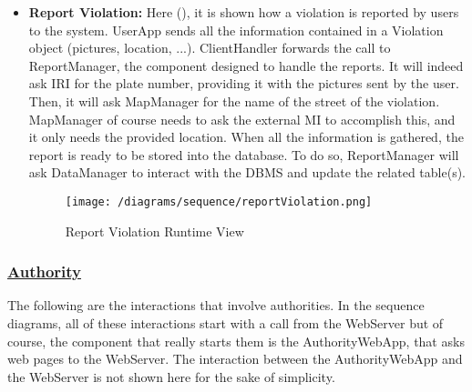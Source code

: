 \begin{itemize}
				\FloatBarrier
				\newpage
			
				\item \textbf{Report Violation:} Here (), it is shown how a violation is reported by users to the system. UserApp sends all the information contained in a Violation object (pictures, location, ...). ClientHandler forwards the call to ReportManager, the component designed to handle the reports. It will indeed ask IRI for the plate number, providing it with the pictures sent by the user. Then, it will ask MapManager for the name of the street of the violation. MapManager of course needs to ask the external MI to accomplish this, and it only needs the provided location. When all the information is gathered, the report is ready to be stored into the database. To do so, ReportManager will ask DataManager to interact with the DBMS and update the related table(s).
				
				\begin{figure}[h!]
					\centering
					\texttt{[image: /diagrams/sequence/reportViolation.png]}
					\caption{\label{fig:reportViolationRuntime} Report Violation Runtime View}
				\end{figure}
			\end{itemize}
		
		\subsubsection[Authority]{\hyperlink{toc}{Authority}}
			\label{sec:authorityRuntimeView}
			
			The following are the interactions that involve authorities. In the sequence diagrams, all of these interactions start with a call from the WebServer but of course, the component that really starts them is the AuthorityWebApp, that asks web pages to the WebServer. The interaction between the AuthorityWebApp and the WebServer is not shown here for the sake of simplicity.
			
